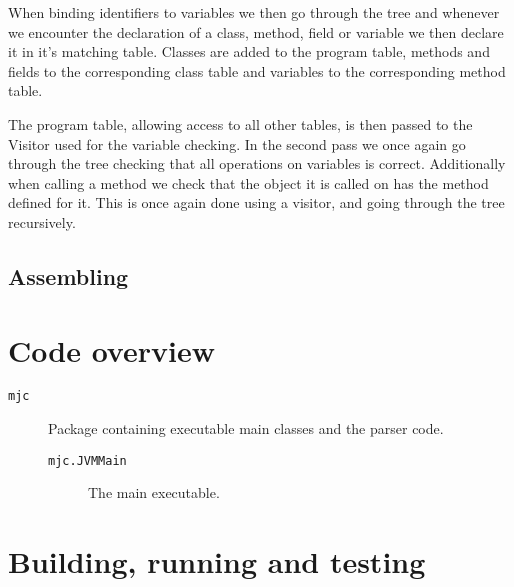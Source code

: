 \documentclass[a4paper]{article}
\begin{document}
When binding identifiers to variables we then go through the tree and whenever
we encounter the declaration of a class, method, field or variable we then
declare it in it's matching table. Classes are added to the program table,
methods and fields to the corresponding class table and variables to the
corresponding method table.

The program table, allowing access to all other tables, is then passed to the
Visitor used for the variable checking. In the second pass we once again go
through the tree checking that all operations on variables is correct.
Additionally when calling a method we check that the object it is called on has
the method defined for it. This is once again done using a visitor, and going
through the tree recursively.

\subsection{Assembling}


\section{Code overview}

\begin{description}
\item[\texttt{mjc}] Package containing executable main classes and the parser
    code.
    \begin{description}
        \item[\texttt{mjc.JVMMain}] The main executable.
    \end{description}
\end{description}

\section{Building, running and testing}
\end{document}
